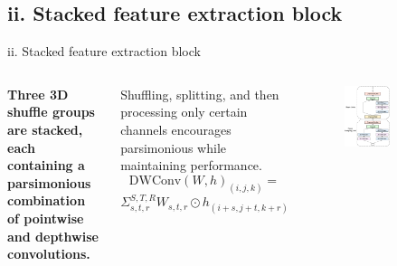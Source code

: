 \documentclass[aspectratio=169,xcolor=dvipsnames]{beamer}
\begin{document}
\subsection{ii. Stacked feature extraction block}
\begin{frame}{ii. Stacked feature extraction block}
    \begin{columns}[c]
        \textbf{Three 3D shuffle groups are stacked, each containing a parsimonious
        combination of pointwise and depthwise convolutions.}
        
        Shuffling, splitting, and then processing only certain channels encourages parsimonious while maintaining performance.
        \newline
        \begin{equation*}
            \text{DWConv}(W, h)_{(i, j, k)} =
        \end{equation*}
        \begin{equation*}
            \Sigma_{s,t,r}^{S, T, R} W_{s,t,r}\odot h_{(i+s,j+t,k+r)}
        \end{equation*}
        \begin{figure}
            \includegraphics[width=0.55\textwidth]{images/network_right}
        \end{figure}
    \end{columns}
\end{frame}
\end{document}
